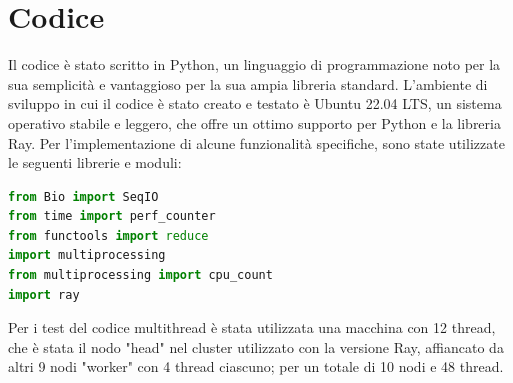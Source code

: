 \documentclass{article}
\begin{document}
    \section{Codice}
    Il codice è stato scritto in Python, un linguaggio di programmazione noto per la sua semplicità e vantaggioso per la sua ampia libreria standard. L'ambiente di sviluppo in cui il codice è stato creato e testato è Ubuntu 22.04 LTS, un sistema operativo stabile e leggero, che offre un ottimo supporto per Python e la libreria Ray.
    Per l'implementazione di alcune funzionalità specifiche, sono state utilizzate le seguenti librerie e moduli:

    \vspace{5pt}
    
    \begin{lstlisting}[language=Python, style=myPythonStyle]
from Bio import SeqIO                                                  # Modulo della libreria Biopython, utilizzato per lavorare con sequenze biologiche (sequenze di DNA, RNA e proteine). SeqIO permette la lettura e la scrittura di file contenenti queste sequenze
from time import perf_counter                                          # Funzione del modulo time che restituisce un tempo di clock per misurare il tempo trascorso tra due punti in un programma
from functools import reduce                                           # Funzione del modulo functools che consente di applicare una funzione cumulativa a elementi di un iterabile, riducendo la sequenza a un singolo valore. Usato per eseguire operazioni di aggregazione su una sequenza di dati.
import multiprocessing                                                 # Libreria che fornisce supporto per la programmazione concorrente, consentendo di eseguire processi multipli contemporaneamente per sfruttare i multi-core delle CPU
from multiprocessing import cpu_count                                  # Funzione che restituisce il numero di core della CPU disponibili sul sistema in uso
import ray                                                             # Libreria per la programmazione parallela e distribuita in Python
\end{lstlisting}

    \vspace{5pt}
    
    Per i test del codice multithread è stata utilizzata una macchina con 12 thread, che è stata il nodo "head" nel cluster utilizzato con la versione Ray, affiancato da altri 9 nodi "worker" con 4 thread ciascuno; per un totale di 10 nodi e 48 thread.
\end{document}
